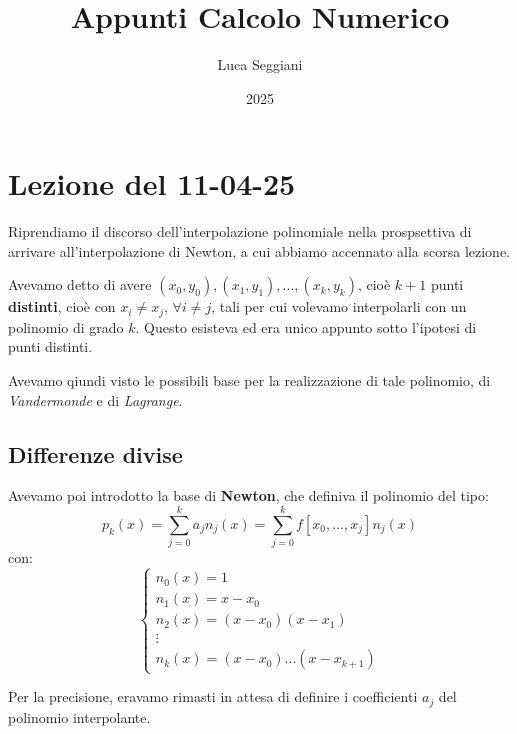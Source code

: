 \documentclass[a4paper,11pt]{article}
\title{Appunti Calcolo Numerico}
\author{Luca Seggiani}
\date{2025}
\begin{document}
\section{Lezione del 11-04-25}

\thispagestyle{empty}
\pagestyle{fancy}

Riprendiamo il discorso dell'interpolazione polinomiale nella prospsettiva di arrivare all'interpolazione di Newton, a cui abbiamo accennato alla scorsa lezione.

Avevamo detto di avere $(x_0, y_0), (x_1, y_1), ..., (x_k, y_k)$, cioè $k + 1$ punti \textbf{distinti}, cioè con $x_i \neq x_j$, $\forall i \neq j$, tali per cui volevamo interpolarli con un polinomio di grado $k$.
Questo esisteva ed era unico appunto sotto l'ipotesi di punti distinti.


Avevamo qiundi visto le possibili base per la realizzazione di tale polinomio, di \textit{Vandermonde} e di \textit{Lagrange}.

\subsection{Differenze divise}
Avevamo poi introdotto la base di \textbf{Newton}, che definiva il polinomio del tipo:
$$
p_k (x) = \sum_{j = 0}^k a_j n_j(x) = \sum_{j = 0}^k f [ x_0, ..., x_j ] n_j(x)
$$
con:
\[
	\begin{cases}
			n_0(x) = 1 \\
			n_1(x) = x - x_0 \\
			n_2(x) = (x - x_0)(x - x_1) \\
			\vdots \\
			n_k(x) = (x - x_0) ... (x - x_{k + 1})
	\end{cases}
\]

Per la precisione, eravamo rimasti in attesa di definire i coefficienti $a_j$ del polinomio interpolante.

\par\smallskip
\end{document}
